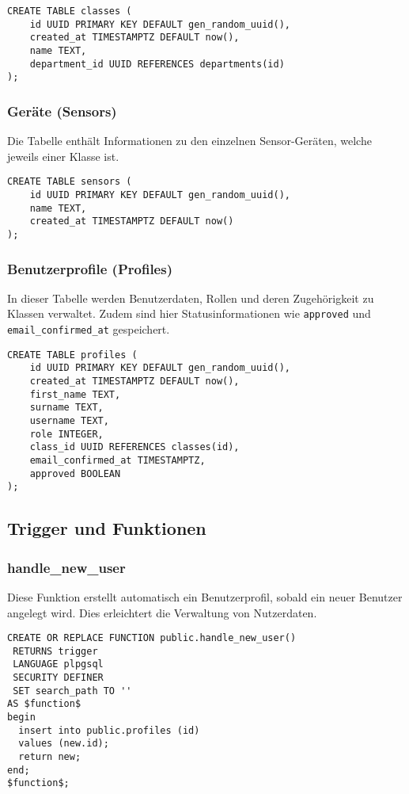 \begin{inhalt}
\begin{lstlisting}[style=mysql]
CREATE TABLE classes (
    id UUID PRIMARY KEY DEFAULT gen_random_uuid(),
    created_at TIMESTAMPTZ DEFAULT now(),
    name TEXT,
    department_id UUID REFERENCES departments(id)
);
\end{lstlisting}

\subsubsection{Geräte (Sensors)}
Die Tabelle enthält Informationen zu den einzelnen Sensor-Geräten, welche jeweils einer Klasse  ist.

\begin{lstlisting}[style=mysql]
CREATE TABLE sensors (
    id UUID PRIMARY KEY DEFAULT gen_random_uuid(),
    name TEXT,
    created_at TIMESTAMPTZ DEFAULT now()
);
\end{lstlisting}

\subsubsection{Benutzerprofile (Profiles)}
In dieser Tabelle werden Benutzerdaten, Rollen und deren Zugehörigkeit zu Klassen verwaltet. Zudem sind hier Statusinformationen wie \texttt{approved} und \texttt{email\_confirmed\_at} gespeichert.

\begin{lstlisting}[style=mysql]
CREATE TABLE profiles (
    id UUID PRIMARY KEY DEFAULT gen_random_uuid(),
    created_at TIMESTAMPTZ DEFAULT now(),
    first_name TEXT,
    surname TEXT,
    username TEXT,
    role INTEGER,
    class_id UUID REFERENCES classes(id),
    email_confirmed_at TIMESTAMPTZ,
    approved BOOLEAN
);
\end{lstlisting}

\subsection{Trigger und Funktionen}

\subsubsection{handle\_new\_user}
Diese Funktion erstellt automatisch ein Benutzerprofil, sobald ein neuer Benutzer angelegt wird. Dies erleichtert die Verwaltung von Nutzerdaten.

\begin{lstlisting}[style=mysql]
CREATE OR REPLACE FUNCTION public.handle_new_user()
 RETURNS trigger
 LANGUAGE plpgsql
 SECURITY DEFINER
 SET search_path TO ''
AS $function$
begin
  insert into public.profiles (id)
  values (new.id);
  return new;
end;
$function$;
\end{lstlisting}


\end{inhalt}
